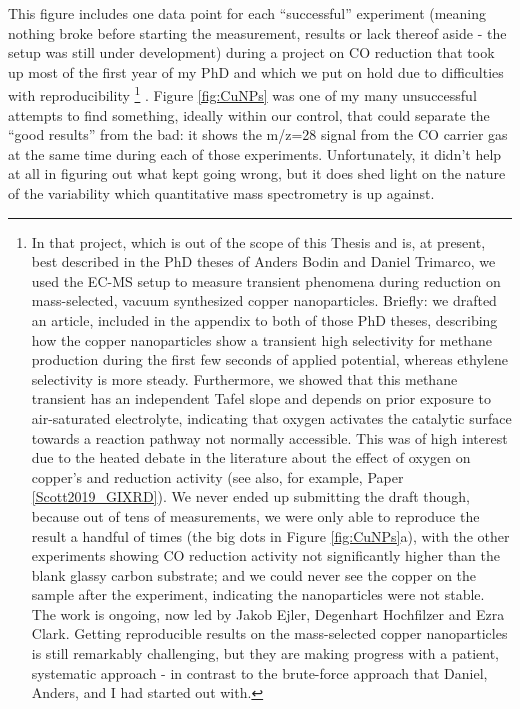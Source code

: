 This figure includes one data point for each ``successful'' experiment (meaning nothing broke before starting the measurement, results or lack thereof aside - the setup was still under development) during a project on CO reduction that took up most of the first year of my PhD and which we put on hold due to difficulties with reproducibility
\footnote{In that project, which is out of the scope of this Thesis and is, at present, best described in the PhD theses of Anders Bodin\cite{Bodin2017_PhD} and Daniel Trimarco\cite{Trimarco2017_PhD}, we used the EC-MS setup to measure transient phenomena during  reduction on mass-selected, vacuum synthesized copper nanoparticles. Briefly: we drafted an article, included in the appendix to both of those PhD theses, describing how the copper nanoparticles show a transient high selectivity for methane production during the first few seconds of applied potential, whereas ethylene selectivity is more steady. Furthermore, we showed that this methane transient has an independent Tafel slope and depends on prior exposure to air-saturated electrolyte, indicating that oxygen activates the catalytic surface towards a reaction pathway not normally accessible. This was of high interest due to the heated debate in the literature about the effect of oxygen on copper's  and  reduction activity\cite{Mistry2016, Gao2017a, Eilert2017, Nitopi2019} (see also, for example, Paper \ref{Scott2019_GIXRD}). We never ended up submitting the draft though, because out of tens of measurements, we were only able to reproduce the result a handful of times (the big dots in Figure \ref{fig:CuNPs}a), with the other experiments showing CO reduction activity not significantly higher than the blank glassy carbon substrate; and we could never see the copper on the sample after the experiment, indicating the nanoparticles were not stable. The work is ongoing, now led by Jakob Ejler, Degenhart Hochfilzer and Ezra Clark. Getting reproducible results on the mass-selected copper nanoparticles is still remarkably challenging, but they are making progress with a patient, systematic approach - in contrast to the brute-force approach that Daniel, Anders, and I had started out with.}
.
Figure \ref{fig:CuNPs} was one of my many unsuccessful attempts to find something, ideally within our control, that could separate the ``good results'' from the bad: it shows the m/z=28 signal from the CO carrier gas at the same time during each of those experiments. Unfortunately, it didn't help at all in figuring out what kept going wrong, but it does shed light on the nature of the variability which quantitative mass spectrometry is up against.

